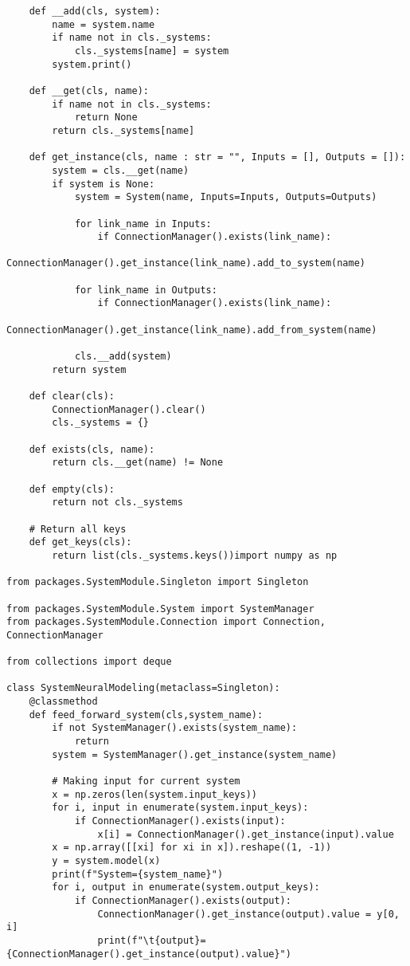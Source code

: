 \begin{verbatim}
    def __add(cls, system):
        name = system.name
        if name not in cls._systems:
            cls._systems[name] = system
        system.print()
    
    def __get(cls, name):
        if name not in cls._systems:
            return None
        return cls._systems[name]
    
    def get_instance(cls, name : str = "", Inputs = [], Outputs = []):
        system = cls.__get(name)
        if system is None:
            system = System(name, Inputs=Inputs, Outputs=Outputs)
            
            for link_name in Inputs:
                if ConnectionManager().exists(link_name):
                    ConnectionManager().get_instance(link_name).add_to_system(name)
            
            for link_name in Outputs:
                if ConnectionManager().exists(link_name):
                    ConnectionManager().get_instance(link_name).add_from_system(name)
            
            cls.__add(system)
        return system
    
    def clear(cls):
        ConnectionManager().clear()
        cls._systems = {}
    
    def exists(cls, name):
        return cls.__get(name) != None
    
    def empty(cls):
        return not cls._systems
    
    # Return all keys
    def get_keys(cls):
        return list(cls._systems.keys())import numpy as np

from packages.SystemModule.Singleton import Singleton

from packages.SystemModule.System import SystemManager
from packages.SystemModule.Connection import Connection, ConnectionManager

from collections import deque

class SystemNeuralModeling(metaclass=Singleton):
    @classmethod
    def feed_forward_system(cls,system_name):
        if not SystemManager().exists(system_name):
            return
        system = SystemManager().get_instance(system_name)
            
        # Making input for current system
        x = np.zeros(len(system.input_keys))
        for i, input in enumerate(system.input_keys):
            if ConnectionManager().exists(input):
                x[i] = ConnectionManager().get_instance(input).value
        x = np.array([[xi] for xi in x]).reshape((1, -1))
        y = system.model(x)
        print(f"System={system_name}")
        for i, output in enumerate(system.output_keys):
            if ConnectionManager().exists(output):
                ConnectionManager().get_instance(output).value = y[0, i]
                print(f"\t{output}={ConnectionManager().get_instance(output).value}")
    

\end{verbatim}
